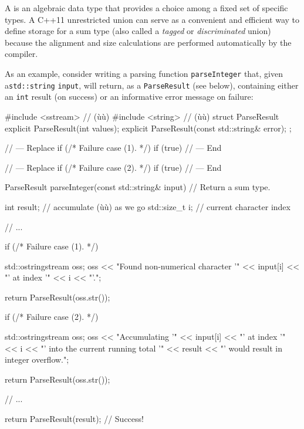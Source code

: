 A  is an algebraic data type that provides a choice
among a fixed set of specific types. A C++11 unrestricted union can serve as a convenient and efficient way to define storage for a sum type (also called a \emph{tagged} or \emph{discriminated} union) because the alignment and size calculations are performed automatically by the compiler.

As an example, consider writing a parsing function \lstinline!parseInteger!
that, given a\linebreak[4] \lstinline!std::string! \lstinline!input!, will return, as a
 \lstinline!ParseResult! (see below), containing either an
\lstinline!int! result (on success) or an informative error message
on failure:

\begin{emcppshiddenlisting}[emcppsbatch=e5]
#include <sstream>  // (ù{}ù)
#include <string>   // (ù{}ù)
struct ParseResult {
    explicit ParseResult(int values);
    explicit ParseResult(const std::string& error);
};

// --- Replace
    if (/* Failure case (1). */)
    if (true)
// --- End

// --- Replace
    if (/* Failure case (2). */)
    if (true)
// --- End

\end{emcppshiddenlisting}
\begin{emcppslisting}[emcppsbatch=e5]
ParseResult parseInteger(const std::string& input)  // Return a sum type.
{
    int result;     // accumulate (ù{}ù) as we go
    std::size_t i;  // current character index

    // ...

    if (/* Failure case (1). */)
    {
        std::ostringstream oss;
        oss << "Found non-numerical character '" << input[i]
            << "' at index '" << i << "'.";

        return ParseResult(oss.str());
    }

    if (/* Failure case (2). */)
    {
        std::ostringstream oss;
        oss << "Accumulating '" << input[i]
            << "' at index '" << i
            << "' into the current running total '" << result
            << "' would result in integer overflow.";

        return ParseResult(oss.str());
    }

    // ...

    return ParseResult(result);  // Success!
}
\end{emcppslisting}

